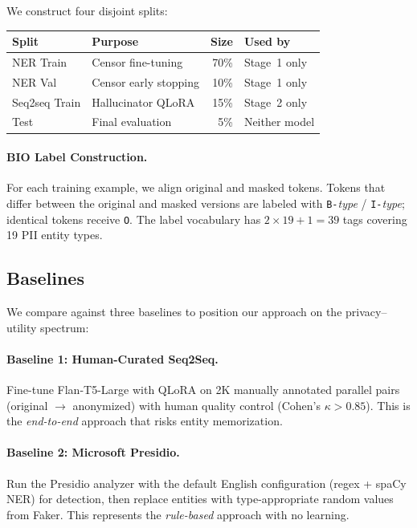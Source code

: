 \documentclass[11pt, a4paper]{article}
\begin{document}
We construct four disjoint splits:
\begin{center}
\small
\begin{tabular}{llrl}
\toprule
\textbf{Split} & \textbf{Purpose} & \textbf{Size} & \textbf{Used by} \\
\midrule
NER Train      & Censor fine-tuning    & 70\% & Stage~1 only \\
NER Val        & Censor early stopping & 10\% & Stage~1 only \\
Seq2seq Train  & Hallucinator QLoRA    & 15\% & Stage~2 only \\
Test           & Final evaluation      &  5\% & Neither model \\
\bottomrule
\end{tabular}
\end{center}

\paragraph{BIO Label Construction.}
For each training example, we align original and masked tokens.  Tokens
that differ between the original and masked versions are labeled with
\texttt{B-}\emph{type} / \texttt{I-}\emph{type}; identical tokens
receive \texttt{O}.  The label vocabulary has $2 \times 19 + 1 = 39$
tags covering 19 PII entity types.

\subsection{Baselines}

We compare against three baselines to position our approach on the
privacy--utility spectrum:

\paragraph{Baseline 1: Human-Curated Seq2Seq.}
Fine-tune Flan-T5-Large with QLoRA on 2K manually annotated parallel
pairs (original $\to$ anonymized) with human quality control
(Cohen's $\kappa > 0.85$).  This is the \emph{end-to-end} approach
that risks entity memorization.

\paragraph{Baseline 2: Microsoft Presidio.}
Run the Presidio analyzer with the default English configuration
(regex + spaCy NER) for detection, then replace entities with
type-appropriate random values from Faker.  This represents the
\emph{rule-based} approach with no learning.
\end{document}
